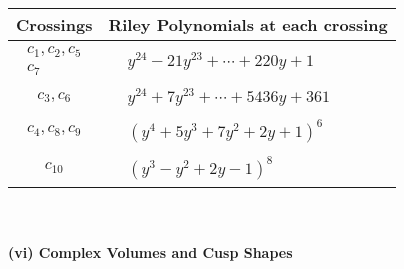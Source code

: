 \documentclass[1p]{elsarticle_modified}
\theoremstyle{definition}
\begin{document}
\begin{tabular}{m{50pt}|m{274pt}}
Crossings & \hspace{64pt}Riley Polynomials at each crossing \\
\hline $$\begin{aligned}c_{1},c_{2},c_{5}\\c_{7}\end{aligned}$$&$\begin{aligned}
&y^{24}-21 y^{23}+\cdots+220 y+1
\end{aligned}$\\
\hline $$\begin{aligned}c_{3},c_{6}\end{aligned}$$&$\begin{aligned}
&y^{24}+7 y^{23}+\cdots+5436 y+361
\end{aligned}$\\
\hline $$\begin{aligned}c_{4},c_{8},c_{9}\end{aligned}$$&$\begin{aligned}
&(y^4+5 y^3+7 y^2+2 y+1)^6
\end{aligned}$\\
\hline $$\begin{aligned}c_{10}\end{aligned}$$&$\begin{aligned}
&(y^3- y^2+2 y-1)^8
\end{aligned}$\\
\hline
\end{tabular}\\~\\
\newpage\flushleft \textbf{(vi) Complex Volumes and Cusp Shapes}
\end{document}
